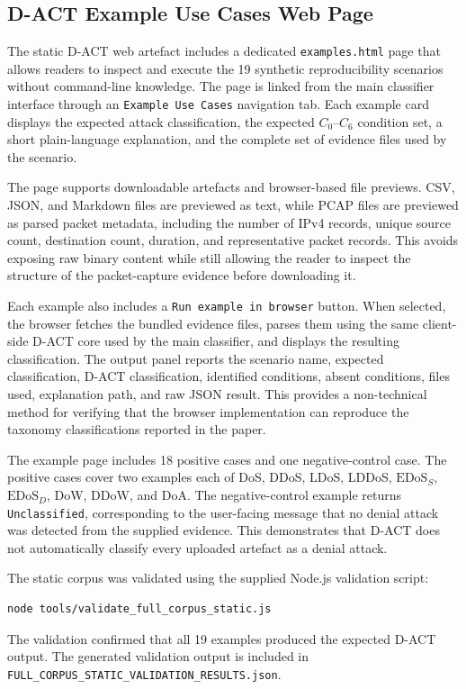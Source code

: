 \subsection{D-ACT Example Use Cases Web Page}
\label{app:dact_example_use_cases_page}

The static D-ACT web artefact includes a dedicated \texttt{examples.html} page that allows readers to inspect and execute the 19 synthetic reproducibility scenarios without command-line knowledge. The page is linked from the main classifier interface through an \texttt{Example Use Cases} navigation tab. Each example card displays the expected attack classification, the expected \(C_0\)--\(C_6\) condition set, a short plain-language explanation, and the complete set of evidence files used by the scenario.

The page supports downloadable artefacts and browser-based file previews. CSV, JSON, and Markdown files are previewed as text, while PCAP files are previewed as parsed packet metadata, including the number of IPv4 records, unique source count, destination count, duration, and representative packet records. This avoids exposing raw binary content while still allowing the reader to inspect the structure of the packet-capture evidence before downloading it.

Each example also includes a \texttt{Run example in browser} button. When selected, the browser fetches the bundled evidence files, parses them using the same client-side D-ACT core used by the main classifier, and displays the resulting classification. The output panel reports the scenario name, expected classification, D-ACT classification, identified conditions, absent conditions, files used, explanation path, and raw JSON result. This provides a non-technical method for verifying that the browser implementation can reproduce the taxonomy classifications reported in the paper.

The example page includes 18 positive cases and one negative-control case. The positive cases cover two examples each of DoS, DDoS, LDoS, LDDoS, \(\text{EDoS}_{S}\), \(\text{EDoS}_{D}\), DoW, DDoW, and DoA. The negative-control example returns \texttt{Unclassified}, corresponding to the user-facing message that no denial attack was detected from the supplied evidence. This demonstrates that D-ACT does not automatically classify every uploaded artefact as a denial attack.

The static corpus was validated using the supplied Node.js validation script:

\begin{lstlisting}[language=bash]
node tools/validate_full_corpus_static.js
\end{lstlisting}

The validation confirmed that all 19 examples produced the expected D-ACT output. The generated validation output is included in \texttt{FULL\_CORPUS\_STATIC\_VALIDATION\_RESULTS.json}.
